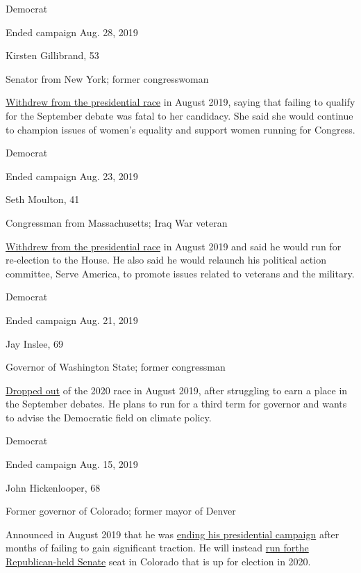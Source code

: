 Democrat

Ended campaign Aug. 28, 2019

Kirsten Gillibrand, 53

Senator from New York; former congresswoman

\href{https://www.nytimes.com/2019/08/28/us/politics/kirsten-gillibrand-2020-drop-out.html}{Withdrew
from the presidential race} in August 2019, saying that failing to
qualify for the September debate was fatal to her candidacy. She said
she would continue to champion issues of women's equality and support
women running for Congress.

Democrat

Ended campaign Aug. 23, 2019

Seth Moulton, 41

Congressman from Massachusetts; Iraq War veteran

\href{https://www.nytimes.com/2019/08/23/us/politics/seth-moulton-2020-drop-out.html}{Withdrew
from the presidential race} in August 2019 and said he would run for
re-election to the House. He also said he would relaunch his political
action committee, Serve America, to promote issues related to veterans
and the military.

Democrat

Ended campaign Aug. 21, 2019

Jay Inslee, 69

Governor of Washington State; former congressman

\href{https://www.nytimes.com/2019/08/21/us/politics/jay-inslee-2020-campaign.html?action=click\&module=Latest\&pgtype=Homepage}{Dropped
out} of the 2020 race in August 2019, after struggling to earn a place
in the September debates. He plans to run for a third term for governor
and wants to advise the Democratic field on climate policy.

Democrat

Ended campaign Aug. 15, 2019

John Hickenlooper, 68

Former governor of Colorado; former mayor of Denver

Announced in August 2019 that he was
\href{https://www.nytimes.com/2019/08/15/us/politics/john-hickenlooper-drop-out-senate.html}{ending
his presidential campaign} after months of failing to gain significant
traction. He will instead
\href{https://www.nytimes.com/2019/08/22/us/politics/john-hickenlooper-senate-2020.html}{run
for}\href{https://www.nytimes.com/2019/08/22/us/politics/john-hickenlooper-senate-2020.html}{the
Republican-held Senate} seat in Colorado that is up for election in
2020.

